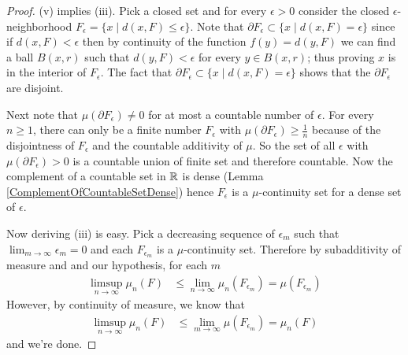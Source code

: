 \begin{proof}
(v) implies (iii).  Pick a closed set and for every $\epsilon > 0$
consider the closed $\epsilon$-neighborhood $F_\epsilon = \lbrace x \mid d(x,
F) \leq  \epsilon \rbrace$.  Note that $\partial F_\epsilon \subset \lbrace x \mid d(x,
F) =  \epsilon \rbrace$ since if $d(x,F) < \epsilon$ then by
continuity of the function $f(y) = d(y,F)$ we can find a ball $B(x,r)$
such that $d(y,F) < \epsilon$ for every $y \in B(x,r)$; thus proving
$x$ is in the interior of $F_\epsilon$.  The fact that $\partial F_\epsilon \subset \lbrace x \mid d(x,
F) =  \epsilon \rbrace$ shows that the $\partial F_\epsilon$ are disjoint.

Next note that $\mu (\partial F_\epsilon) \neq 0$ for at most a
countable number of $\epsilon$.  For every $n \geq 1$, there can only
be a finite number $F_\epsilon$ with $\mu (\partial F_\epsilon) \geq
\frac{1}{n}$ because of the disjointness of $F_\epsilon$ and the
countable additivity of $\mu$.  So the set of all $\epsilon$ with $\mu
(\partial F_\epsilon)  > 0$ is a countable union of finite set and
therefore countable.  Now the complement of a countable set in
$\mathbb{R}$ is dense (Lemma \ref{ComplementOfCountableSetDense}) hence $F_\epsilon$ is a $\mu$-continuity set for a
dense set of $\epsilon$.  

Now deriving (iii) is easy.  Pick a decreasing sequence of $\epsilon_m$ such that
$\lim_{m \to \infty} \epsilon_m = 0$ and each $F_{\epsilon_m}$ is a
$\mu$-continuity set.  Therefore by subadditivity of measure and and our
hypothesis, for each $m$
\begin{align*}
\limsup_{n \to \infty} \mu_n(F) &\leq \lim_{n \to \infty}
\mu_n(F_{\epsilon_m}) = \mu(F_{\epsilon_m})
\end{align*}
However, by continuity of measure, we know
that 
\begin{align*}
\limsup_{n \to \infty} \mu_n(F) &\leq \lim_{m \to \infty} \mu(F_{\epsilon_m}) = \mu_n(F)
\end{align*}
and we're done.
\end{proof}

